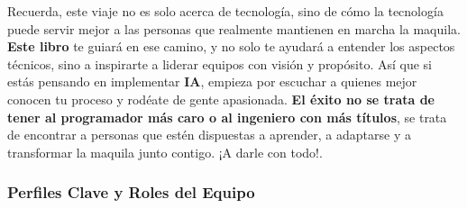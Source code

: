 \documentclass[
  10pt,
  letterpaper,
]{book}
\begin{document}
Recuerda, este viaje no es solo acerca de tecnología, sino de cómo la
tecnología puede servir mejor a las personas que realmente mantienen en
marcha la maquila. \textbf{Este libro} te guiará en ese camino, y no
solo te ayudará a entender los aspectos técnicos, sino a inspirarte a
liderar equipos con visión y propósito. Así que si estás pensando en
implementar \textbf{IA}, empieza por escuchar a quienes mejor conocen tu
proceso y rodéate de gente apasionada. \textbf{El éxito no se trata de
tener al programador más caro o al ingeniero con más títulos}, se trata
de encontrar a personas que estén dispuestas a aprender, a adaptarse y a
transformar la maquila junto contigo. ¡A darle con todo!.

\subsubsection{\texorpdfstring{\textbf{Perfiles Clave y Roles del
Equipo}}{Perfiles Clave y Roles del Equipo}}\label{perfiles-clave-y-roles-del-equipo}
\end{document}
